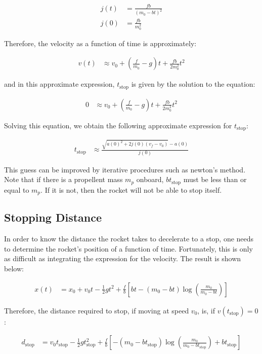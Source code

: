\documentclass{article}
\begin{document}
\begin{align}
	j(t) & = \frac {f b} {(m_0 - b t)^2} \nonumber \\
	j(0) & = \frac {f b} {m_0^2}
\end{align}

Therefore, the velocity as a function of time is approximately:

\begin{align*}
	v(t) & \approx v_0 + \left( \frac f {m_0} - g \right) t
		+ \frac {f b} {2 m_0^2} t^2
\end{align*}

and in this approximate expression, $t_\text{stop}$ is given by the solution
	to the equation:

\begin{align*}
	0 & \approx v_0 + \left( \frac f {m_0} - g \right) t
		+ \frac {f b} {2 m_0^2} t^2
\end{align*}

Solving this equation, we obtain the following approximate expression for $t_\text{stop}$:

\begin{align}
	t_\text{stop} & \approx	\frac{\sqrt{a(0)^2 + 2 j(0) (v_f - v_0)} - a(0)}{j(0)}
\end{align}

This guess can be improved by iterative procedures such as newton's method.
Note that if there is a propellent mass $m_p$ onboard, $b t_\text{stop}$ must be
	less than or equal to $m_p$.
If it is not, then the rocket will not be able to stop itself.

\subsection{Stopping Distance}

In order to know the distance the rocket takes to decelerate to a stop,
	one needs to determine the rocket's position of a function of time.
Fortunately, this is only as difficult as integrating the expression for the velocity.
The result is shown below:

\begin{align}
	x(t) & = x_0 + v_0 t - \frac 1 2 g t^2 + \frac f b \left[
		b t - \left(m_0 - b t\right) \log \left( \frac {m_0} {m_0 - b t} \right) \right]
\end{align}

Therefore, the distance required to stop, if moving at speed $v_0$, 
	is, if $v(t_\text{stop}) = 0$:

\begin{align}
	d_\text{stop} & = v_0 t_\text{stop} - \frac 1 2 g t_\text{stop}^2 
	+ \frac f b \left[ 
		-(m_0 - b t_\text{stop}) \log \left( \frac {m_0} {m_0 - b t_\text{stop}} \right)
		+ b t_\text{stop} \right]
\end{align}
\end{document}
